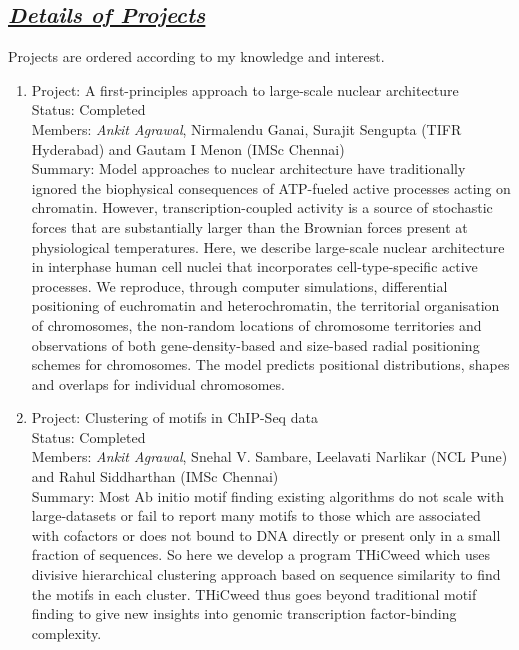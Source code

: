 \documentclass{res}
\begin{document}
\begin{resume}
\section{\sl  \underline{Details of Projects}} Projects are ordered according to my knowledge and interest. \\

\begin{enumerate}
\item Project: A first-principles approach to large-scale nuclear architecture \\
 Status: Completed  \\ 
 Members: \emph{ Ankit Agrawal}, Nirmalendu Ganai, Surajit Sengupta (TIFR Hyderabad) and Gautam I Menon (IMSc Chennai) \\
 Summary: Model approaches to nuclear architecture have traditionally ignored the biophysical
consequences of ATP-fueled active processes acting on chromatin. However, transcription-coupled
activity is a source of stochastic forces that are substantially larger than the Brownian
forces present at physiological temperatures. Here, we describe large-scale nuclear architecture in interphase human cell nuclei that incorporates cell-type-specific active processes. We reproduce, through computer simulations, differential positioning of euchromatin and heterochromatin, the territorial organisation of
chromosomes, the non-random locations of chromosome territories and observations of both
gene-density-based and size-based radial positioning schemes for chromosomes. The model
predicts positional distributions, shapes and overlaps for individual chromosomes. \\




\item Project: Clustering of motifs in ChIP-Seq data \\
 Status: Completed  \\
 Members: \emph{Ankit Agrawal}, Snehal V. Sambare, Leelavati Narlikar (NCL Pune) and Rahul Siddharthan (IMSc Chennai) \\
 Summary: Most Ab initio motif finding existing algorithms do not scale with large-datasets or fail to report many motifs to those which are associated with cofactors or does not bound to DNA directly or present only in a small fraction of sequences.
So here we develop a program THiCweed which uses divisive hierarchical clustering approach based on sequence similarity to
find the motifs in each cluster. THiCweed thus goes beyond traditional motif finding to give new insights into genomic transcription factor-binding complexity. \\



\end{enumerate}
\end{resume}
\end{document}
